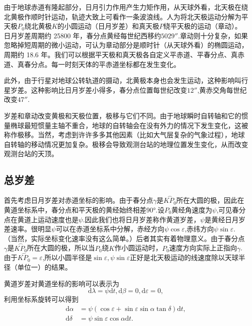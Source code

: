 \documentclass[11pt, a4paper, oneside]{ctexart}
\numberwithin{equation}{subsection}
\begin{document}
由于地球赤道有隆起部分，日月引力作用产生力矩作用，从天球外看，北天极在绕北黄极作顺时针运动，轨迹大致上可看作一条波浪线。人为将北天极运动分解为平天极$P_{0}$绕北黄极$K$的小圆运动（日月岁差）和真天极$P$绕平天极的运动（章动）。日月岁差周期约 25800 年，春分点黄经每世纪西移约$\ang{;;5029}$.章动则十分复杂，如果忽略掉短周期的微小运动，可认为章动部分是顺时针（从天球外看）的椭圆运动，周期约 18.6 年。我们可以根据平天极和真天极各自定义平赤道、平春分点、真赤道、真春分点。每一时刻天体的平赤道坐标都在发生变化。

此外，由于行星对地球公转轨道的摄动，北黄极本身也会发生运动，这种影响叫行星岁差。这种影响比日月岁差小得多，春分点位置每世纪改变$\ang{;;12}$,黄赤交角每世纪改变$\ang{;;47}$.

岁差和章动改变黄极和天极位置，极移与它们不同。由于地球瞬时自转轴和它的惯量椭球最短惯量主轴不重合，地球的自转轴会在没有外力的情况下发生变化，这被称作极移。当然，考虑到许许多多其他因素（比如大气层复杂的气象过程），地球自转轴的移动情况更加复杂。极移会导致观测台站的地理位置发生变化，从而改变观测台站的天顶。

\subsection{总岁差}
首先考虑日月岁差对赤道坐标的影响。由于春分点$\gamma$是$\overset{\frown}{KP_{0}}$所在大圆的极，因此在黄道坐标系中，春分点和平天极的黄经始终相差$\ang{90;;}$.设$P_{0}$黄经角速度为$\psi$,可见春分点在黄道上运动速度也是$\psi$.因此我们也将日月岁差称作黄道岁差，$\psi$是黄经日月岁差速率。很明显$\psi$可以在赤道坐标系中分解，赤经方向$\psi\cos\varepsilon$,赤纬方向$\psi\sin\varepsilon$.（当然，实际坐标变化速率没有这么简单。）后者其实有着物理意义。由于春分点$\gamma$是$\overset{\frown}{KP_{0}}$所在大圆的极，所以当$P_{0}$绕$K$作小圆运动时，$P_{0}$速度方向实际上正指向$\gamma$.由于$\overset{\frown}{KP_{0}}=\varepsilon$,所以小圆半径是$\sin\varepsilon,\psi\sin\varepsilon$正好是北天极运动的线速度除以天球半径（单位一）的结果。

黄道岁差对黄道坐标的影响可以表示为
\begin{equation}
\mathrm{d}\lambda=\psi\mathrm{d}t,\mathrm{d}\beta=0,\mathrm{d}\varepsilon=0,
\end{equation}
利用坐标系旋转可以得到
\begin{align}
\mathrm{d}\alpha&=\psi\left(\cos\varepsilon+\sin\varepsilon\sin\alpha\tan\delta{}\right)\mathrm{d}t,\\
\mathrm{d}\delta{}&=\psi\sin\varepsilon\cos\alpha\mathrm{d}t.
\end{align}
\end{document}
